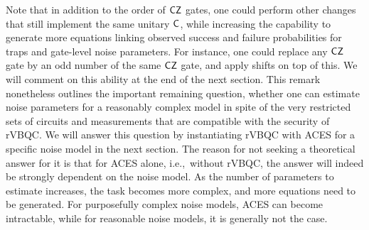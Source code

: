 Note that in addition to the order of \(\mathsf{CZ}\) gates, one could perform other changes that still implement the same unitary \(\mathsf{C}\), while increasing the capability to generate more equations linking observed success and failure probabilities for traps and gate-level noise parameters. For instance, one could replace any \(\mathsf{CZ}\) gate by an odd number of the same \(\mathsf{CZ}\) gate, and apply shifts on top of this. We will comment on this ability at the end of the next section. This remark nonetheless outlines the important remaining question, whether one can estimate noise parameters for a reasonably complex model in spite of the very restricted sets of circuits and measurements that are compatible with the security of rVBQC. We will answer this question by instantiating rVBQC with ACES for a specific noise model in the next section. The reason for not seeking a theoretical answer for it is that for ACES alone, i.e.,~without rVBQC, the answer will indeed be strongly dependent on the noise model. As the number of parameters to estimate increases, the task becomes more complex, and more equations need to be generated. For purposefully complex noise models, ACES can become intractable, while for reasonable noise models, it is generally not the case.


